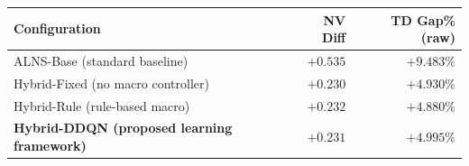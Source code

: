 \caption{Ablation Analysis: Component contributions (overall $N=176$ instances). NV Diff (mean fleet gap to BKS) drops sharply from ALNS-Base to any hybrid variant, then flattens among hybrids. Raw TD Gap rises in lock-step --- an arithmetic consequence of fewer vehicles covering the same customers, not a quality loss; the valid, vehicle-matched distance comparison is the strict fair intersection of Table~\ref{tab:distance_summary}, where Hybrid-DDQN attains the lowest gap ($+1.078\%$).}
\label{tab:ablation}
\begin{tabular}{@{}lrr@{}}
\toprule
\textbf{Configuration} & \textbf{NV Diff} & \textbf{TD Gap\% (raw)}\\
\midrule
ALNS-Base (standard baseline) & $+0.535$ & $+9.483\%$ \\
Hybrid-Fixed (no macro controller) & $+0.230$ & $+4.930\%$ \\
Hybrid-Rule (rule-based macro) & $+0.232$ & $+4.880\%$ \\
\textbf{Hybrid-DDQN (proposed learning framework)} & $\mathbf{+0.231}$ & $+4.995\%$ \\
\bottomrule
\end{tabular}
